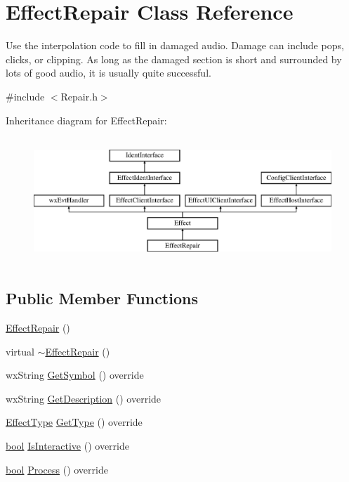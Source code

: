 \hypertarget{class_effect_repair}{}\section{Effect\+Repair Class Reference}
\label{class_effect_repair}


Use the interpolation code to fill in damaged audio. Damage can include pops, clicks, or clipping. As long as the damaged section is short and surrounded by lots of good audio, it is usually quite successful.  




{\ttfamily \#include $<$Repair.\+h$>$}

Inheritance diagram for Effect\+Repair\+:\begin{figure}[H]
\begin{center}
\leavevmode
\includegraphics[height=4.794520cm]{class_effect_repair}
\end{center}
\end{figure}
\subsection*{Public Member Functions}
\begin{DoxyCompactItemize}
\item 
\hyperlink{class_effect_repair_a757e18d695650798aa015622f4c14ba1}{Effect\+Repair} ()
\item 
virtual \hyperlink{class_effect_repair_a7435cd08e25ea251b88780a9153dad7b}{$\sim$\+Effect\+Repair} ()
\item 
wx\+String \hyperlink{class_effect_repair_af1d9234266578f1ce3645797010d4cf6}{Get\+Symbol} () override
\item 
wx\+String \hyperlink{class_effect_repair_aa962c5127e028b592df20ce23f807ecd}{Get\+Description} () override
\item 
\hyperlink{_effect_interface_8h_a4809a7bb3fd1a421902a667cc1405d43}{Effect\+Type} \hyperlink{class_effect_repair_aaa03d04050aac69f16c7f10f16475db1}{Get\+Type} () override
\item 
\hyperlink{mac_2config_2i386_2lib-src_2libsoxr_2soxr-config_8h_abb452686968e48b67397da5f97445f5b}{bool} \hyperlink{class_effect_repair_a4b7ccff0d1e48fce1bf48a51e64c1e17}{Is\+Interactive} () override
\item 
\hyperlink{mac_2config_2i386_2lib-src_2libsoxr_2soxr-config_8h_abb452686968e48b67397da5f97445f5b}{bool} \hyperlink{class_effect_repair_aae103cf1551fc7a15ea7c974843916d3}{Process} () override
\end{DoxyCompactItemize}
